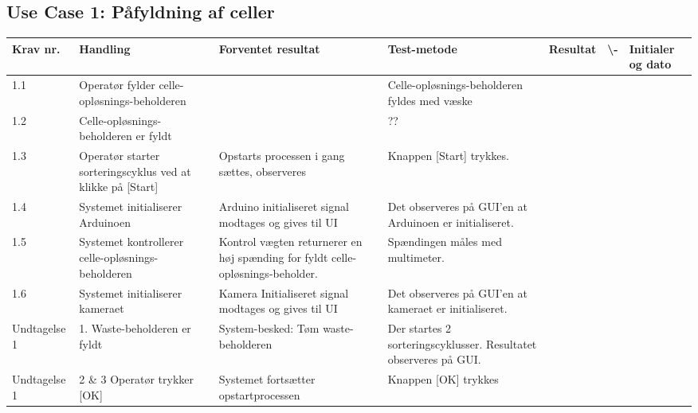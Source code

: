 \subsection{Use Case 1: Påfyldning af celler}
\begin{center}
		\begin{longtable}{ | m{1.785cm} | m{1.785cm}| m{1.785cm}| m{1.785cm}| m{1.785cm}| m{1.785cm}|m{1.785cm}| } 
			\hline
			\textbf{Krav nr.} &\textbf{ Handling} & \textbf{Forventet resultat} & \textbf{Test-metode} &\textbf{Resultat} & \textbf{ \checkmark \textbackslash -} & \textbf{Initialer og dato} \\ 
			
			\hline
			1.1 &  Operatør fylder celle-opløsnings-beholderen &  & Celle-opløsnings-beholderen fyldes med væske  &  & & \\
			
			
			\hline
			1.2 &  Celle-opløsnings-beholderen er fyldt &  & ??  &  & & \\
			\hline
			
			1.3 &  Operatør starter sorteringscyklus ved at klikke på [Start]  & Opstarts processen i gang sættes, observeres & Knappen [Start] trykkes.  &  & & \\
			\hline
			
			1.4 &  Systemet initialiserer Arduinoen  & Arduino initialiseret signal modtages og gives til UI & Det observeres på GUI’en at Arduinoen er initialiseret.  &  & & \\
			\hline
			
			1.5 &  Systemet kontrollerer celle-opløsnings-beholderen & Kontrol vægten returnerer en høj spænding for fyldt celle-opløsnings-beholder. & Spændingen måles med multimeter.  &  & & \\
			\hline
			\fxnote{ Tabeloverskrifter skal fortsætte på næste side}
			1.6  &  Systemet initialiserer kameraet & Kamera Initialiseret signal modtages og gives til UI & Det observeres på GUI’en at kameraet er initialiseret.  &  & & \\
			\hline
			
			Undtagelse 1 & 1. Waste-beholderen er fyldt & System-besked: Tøm waste-beholderen & Der startes 2 sorteringscyklusser. Resultatet observeres på GUI.  &  & & \\
			\hline
			
			Undtagelse 1 & 2 \& 3 Operatør trykker [OK] & Systemet fortsætter opstartprocessen & Knappen [OK] trykkes  &  & & \\
			\hline
	

\end{longtable}
\end{center}
